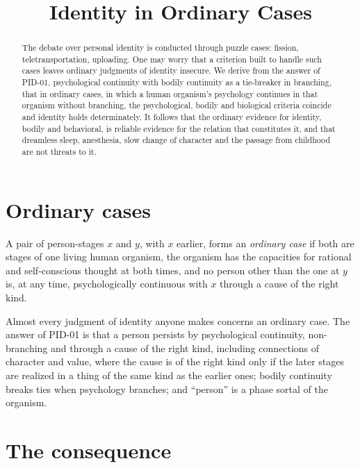 \documentclass{situationist-preprint}
\title{Identity in Ordinary Cases}
\begin{document}
\maketitle

\begin{abstract}
The debate over personal identity is conducted through puzzle cases: fission, teletransportation, uploading. One may worry that a criterion built to handle such cases leaves ordinary judgments of identity insecure. We derive from the answer of PID-01, psychological continuity with bodily continuity as a tie-breaker in branching, that in ordinary cases, in which a human organism's psychology continues in that organism without branching, the psychological, bodily and biological criteria coincide and identity holds determinately. It follows that the ordinary evidence for identity, bodily and behavioral, is reliable evidence for the relation that constitutes it, and that dreamless sleep, anesthesia, slow change of character and the passage from childhood are not threats to it.
\end{abstract}

\section{Ordinary cases}

\begin{definition}\label{d:ord}
A pair of person-stages $x$ and $y$, with $x$ earlier, forms an \emph{ordinary case} if both are stages of one living human organism, the organism has the capacities for rational and self-conscious thought at both times, and no person other than the one at $y$ is, at any time, psychologically continuous with $x$ through a cause of the right kind.
\end{definition}

Almost every judgment of identity anyone makes concerns an ordinary case. The answer of PID-01 is that a person persists by psychological continuity, non-branching and through a cause of the right kind, including connections of character and value, where the cause is of the right kind only if the later stages are realized in a thing of the same kind as the earlier ones; bodily continuity breaks ties when psychology branches; and \enquote{person} is a phase sortal of the organism.

\section{The consequence}
\end{document}
